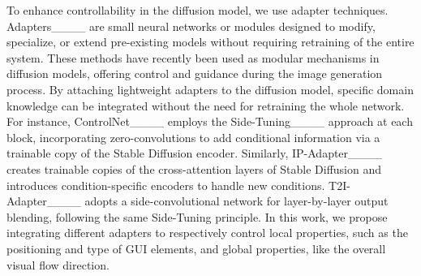 To enhance controllability in the diffusion model, we use adapter techniques.
Adapters____ are small neural networks or modules designed to modify, specialize, or extend pre-existing models without requiring retraining of the entire system. These methods have recently been used as modular mechanisms in diffusion models, offering control and guidance during the image generation process.
%
By attaching lightweight adapters to the diffusion model, specific domain knowledge can be integrated without the need for retraining the whole network. For instance, ControlNet____ employs the Side-Tuning____ approach at each block, incorporating zero-convolutions to add conditional information via a trainable copy of the Stable Diffusion encoder.
%
Similarly, IP-Adapter____ creates trainable copies of the cross-attention layers of Stable Diffusion and introduces condition-specific encoders to handle new conditions. T2I-Adapter____ adopts a side-convolutional network for layer-by-layer output blending, following the same Side-Tuning principle.
%
In this work, we propose integrating different adapters to respectively control local properties, such as the positioning and type of GUI elements, and global properties, like the overall visual flow direction.












   







